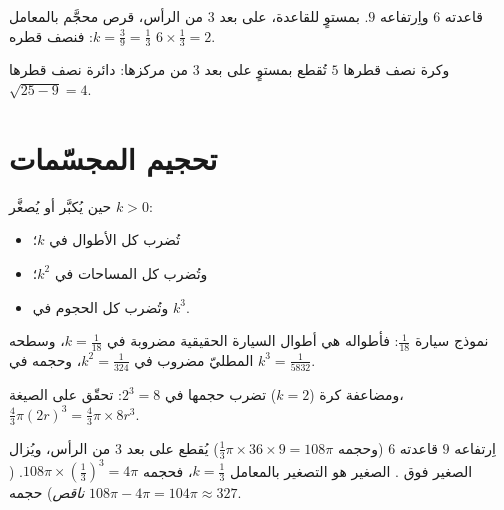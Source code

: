 \begin{example}\label{ex:g9:solids:section}
  قاعدته $6$ واِرتفاعه $9$.  بمستوٍ
 للقاعدة، على بعد $3$ من الرأس، قرص محجَّم بالمعامل
$k = \frac39 = \frac13$: فنصف قطره $6 \times \frac13 = 2$.

وكرة نصف قطرها $5$ تُقطع بمستوٍ على بعد $3$ من مركزها:
 دائرة نصف قطرها $\sqrt{25 - 9} = 4$.
\end{example}

\section{تحجيم المجسّمات}

\begin{theorem}\label{thm:g9:solids:scaling}
حين يُكبَّر  أو يُصغَّر  $k > 0$:
\begin{itemize}
  \item تُضرب كل الأطوال في $k$؛
  \item وتُضرب كل المساحات في $k^2$؛
  \item وتُضرب كل الحجوم في $k^3$.
\end{itemize}
\end{theorem}
\admitted

\begin{example}\label{ex:g9:solids:scaling}
نموذج سيارة  $\frac{1}{18}$: فأطواله هي أطوال السيارة
الحقيقية مضروبة في $k = \frac{1}{18}$، وسطحه المطليّ مضروب في
$k^2 = \frac{1}{324}$، وحجمه في $k^3 = \frac{1}{5832}$.

ومضاعفة  كرة ($k = 2$) تضرب حجمها في
$2^3 = 8$: تحقّق على الصيغة،
$\frac43\pi (2r)^3 = \frac43 \pi \times 8r^3$.
\end{example}

\begin{example}\label{ex:g9:solids:truncated}
 اِرتفاعه $9$  قاعدته $6$ (وحجمه
$\frac13 \pi \times 36 \times 9 = 108\pi$) يُقطع على بعد $3$ من
الرأس، ويُزال  الصغير فوق .  الصغير هو
التصغير بالمعامل $k = \frac13$، فحجمه
$108\pi \times \left(\frac13\right)^3 = 4\pi$.  
(\emph{ ناقص}) حجمه $108\pi - 4\pi = 104\pi \approx 327$.
\end{example}

